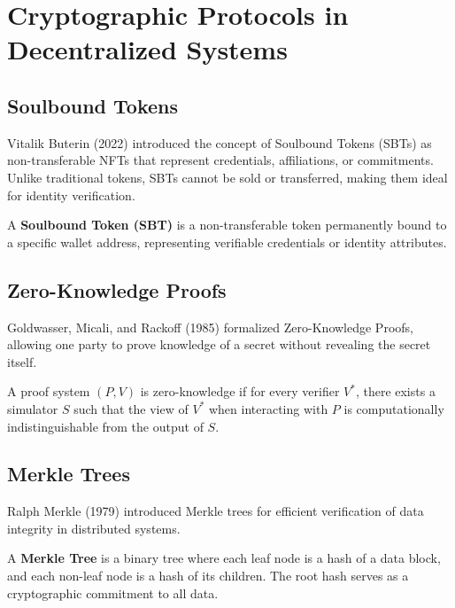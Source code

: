 \section{Cryptographic Protocols in Decentralized Systems}

\subsection{Soulbound Tokens}

Vitalik Buterin (2022) introduced the concept of Soulbound Tokens (SBTs) as non-transferable NFTs that represent credentials, affiliations, or commitments. Unlike traditional tokens, SBTs cannot be sold or transferred, making them ideal for identity verification.

\begin{definition}
A \textbf{Soulbound Token (SBT)} is a non-transferable token permanently bound to a specific wallet address, representing verifiable credentials or identity attributes.
\end{definition}

\subsection{Zero-Knowledge Proofs}

Goldwasser, Micali, and Rackoff (1985) formalized Zero-Knowledge Proofs, allowing one party to prove knowledge of a secret without revealing the secret itself.

\begin{theorem}
A proof system $(P, V)$ is zero-knowledge if for every verifier $V^*$, there exists a simulator $S$ such that the view of $V^*$ when interacting with $P$ is computationally indistinguishable from the output of $S$.
\end{theorem}

\subsection{Merkle Trees}

Ralph Merkle (1979) introduced Merkle trees for efficient verification of data integrity in distributed systems.

\begin{definition}
A \textbf{Merkle Tree} is a binary tree where each leaf node is a hash of a data block, and each non-leaf node is a hash of its children. The root hash serves as a cryptographic commitment to all data.
\end{definition}

